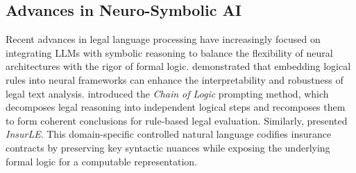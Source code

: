 


\subsection{Advances in Neuro-Symbolic AI}
Recent advances in legal language processing have increasingly focused on integrating LLMs with symbolic reasoning to balance the flexibility of neural architectures with the rigor of formal logic. \citet{ssrn5023212} demonstrated that embedding logical rules into neural frameworks can enhance the interpretability and robustness of legal text analysis. \citet{servantez2024} introduced the \textit{Chain of Logic} prompting method, which decomposes legal reasoning into independent logical steps and recomposes them to form coherent conclusions for rule‐based legal evaluation. Similarly,  \citet{InsurLE} presented \textit{InsurLE}. This domain-specific controlled natural language codifies insurance contracts by preserving key syntactic nuances while exposing the underlying formal logic for a computable representation. 

